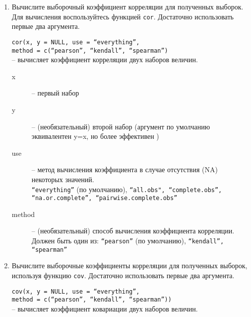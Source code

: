 \begin{enumerate}
    \newpage

    \item Вычислите выборочный коэффициент корреляции для полученных выборок. Для вычисления 
          воспользуйтесь функцией \texttt{cor}. Достаточно использовать первые два аргумента.

          \begin{mdframed}[style=BadassFrame]

              \texttt{cor(x, y = NULL, use = ``everything'', \\ \phantom{    } method = c(``pearson'', ``kendall'', ``spearman'')} \\
                -- вычисляет коэффициент корреляции двух наборов величин. 
              \begin{description}

                \item[x] -- первый набор
                \item[y] -- (необязательный) второй набор (аргумент по умолчанию эквивалентен y=x, но более эффективен )
                \item[use] -- метод вычисления коэффициента в случае отсутствия (NA) некоторых значений. \\
                     \texttt{``everything''} (по умолчанию),  \texttt{``all.obs", ``complete.obs'', ``na.or.complete'', ``pairwise.complete.obs''}
                \item[method] -- (необязательный) способ вычисления коэффициента корреляции. Должен быть один из: 
                     \texttt{``pearson''} (по умолчанию), \texttt{``kendall'', ``spearman''}
              \end{description}
          \end{mdframed}

    \item Вычислите выборочные коэффициенты корреляции для полученных выборок, используя функцию 
          \texttt{cov}. Достаточно использовать первые два аргумента.

          \begin{mdframed}[style=BadassFrame]

              \texttt{cov(x, y = NULL, use = ``everything'', \\ \phantom{    } method = c(``pearson'', ``kendall'', ``spearman''))} \\
                    -- вычисляет коэффициент ковариации двух наборов величин. 
              \begin{description}


\end{description}
\end{mdframed}
\end{enumerate}
